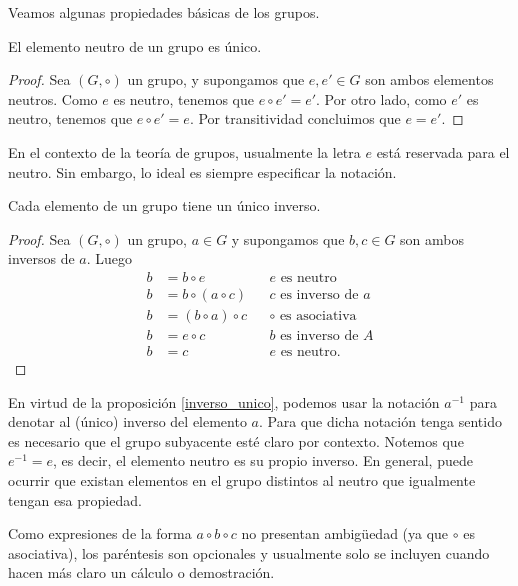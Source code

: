 Veamos algunas propiedades básicas de los grupos.

\begin{proposition}
El elemento neutro de un grupo es único.
\end{proposition}

\begin{proof}
Sea $(G,\circ)$ un grupo, y supongamos que $e, e' \in G$ son ambos elementos neutros. Como $e$ es neutro, tenemos que $e \circ e' = e'$. Por otro lado, como $e'$ es neutro, tenemos que $e \circ e' = e$. Por transitividad concluimos que $e = e'$.
\end{proof}

En el contexto de la teoría de grupos, usualmente la letra $e$ está reservada para el neutro. Sin embargo, lo ideal es siempre especificar la notación. 

\begin{proposition} \label{inverso_unico}
	Cada elemento de un grupo tiene un único inverso.
	\end{proposition}
	
	\begin{proof}
	Sea $(G,\circ)$ un grupo, $a \in G$ y supongamos que $b, c \in G$ son ambos inversos de $a$. Luego
	\begin{align*}
	b &= b \circ e && e \text{ es neutro} \\
	b &= b \circ \left( a \circ c \right) && c \text{ es inverso de } a \\
	b &= \left( b \circ a \right) \circ c && \text{$\circ$} \text{ es asociativa} \\
	b &= e \circ c && b \text{ es inverso de } A \\
	b &= c && e \text{ es neutro}.
	\end{align*}
	\end{proof}

En virtud de la proposición \ref{inverso_unico}, podemos usar la notación $a^{-1}$ para denotar al (único) inverso del elemento $a$. Para que dicha notación tenga sentido es necesario que el grupo subyacente esté claro por contexto. 
Notemos que $e^{-1} = e$, es decir, el elemento neutro es su propio inverso. En general, puede ocurrir que existan elementos en el grupo distintos al neutro que igualmente tengan esa propiedad.

Como expresiones de la forma $a \circ b \circ c$ no presentan ambigüedad (ya que $\circ$ es asociativa), los paréntesis son opcionales y usualmente solo se incluyen cuando hacen más claro un cálculo o demostración.

